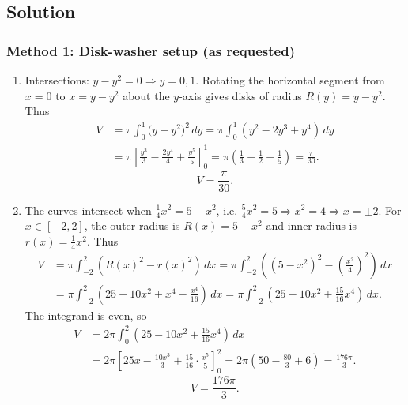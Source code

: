 \documentclass[12pt]{article}
\begin{document}
\subsection*{Solution}

\subsubsection*{Method 1: Disk-washer setup (as requested)}

\begin{enumerate}[label=(\alph*)]
\item Intersections: \(y-y^2=0 \Rightarrow y=0,1\).
Rotating the horizontal segment from \(x=0\) to \(x=y-y^2\) about the \(y\)-axis gives disks of radius \(R(y)=y-y^2\).
Thus
\begin{align*}
V
&=\pi\int_{0}^{1}\big(y-y^2\big)^2\,dy
=\pi\int_{0}^{1}\left(y^2-2y^3+y^4\right)\,dy\\
&=\pi\left[\frac{y^3}{3}-\frac{2y^4}{4}+\frac{y^5}{5}\right]_{0}^{1}
=\pi\left(\frac13-\frac12+\frac15\right)
=\frac{\pi}{30}.
\end{align*}
\[
\boxed{V=\frac{\pi}{30}.}
\]

\item The curves intersect when \(\frac14 x^2 = 5-x^2\), i.e. \(\frac54 x^2=5\Rightarrow x^2=4\Rightarrow x=\pm 2\).
For \(x\in[-2,2]\), the outer radius is \(R(x)=5-x^2\) and inner radius is \(r(x)=\frac14 x^2\).
Thus
\begin{align*}
V
&=\pi\int_{-2}^{2}\left(R(x)^2-r(x)^2\right)\,dx
=\pi\int_{-2}^{2}\left((5-x^2)^2-\left(\frac{x^2}{4}\right)^2\right)\,dx\\
&=\pi\int_{-2}^{2}\left(25-10x^2+x^4-\frac{x^4}{16}\right)\,dx
=\pi\int_{-2}^{2}\left(25-10x^2+\frac{15}{16}x^4\right)\,dx.
\end{align*}
The integrand is even, so
\begin{align*}
V
&=2\pi\int_{0}^{2}\left(25-10x^2+\frac{15}{16}x^4\right)\,dx\\
&=2\pi\left[25x-\frac{10x^3}{3}+\frac{15}{16}\cdot\frac{x^5}{5}\right]_{0}^{2}
=2\pi\left(50-\frac{80}{3}+6\right)
=\frac{176\pi}{3}.
\end{align*}
\[
\boxed{V=\frac{176\pi}{3}.}
\]


\end{enumerate}
\end{document}
